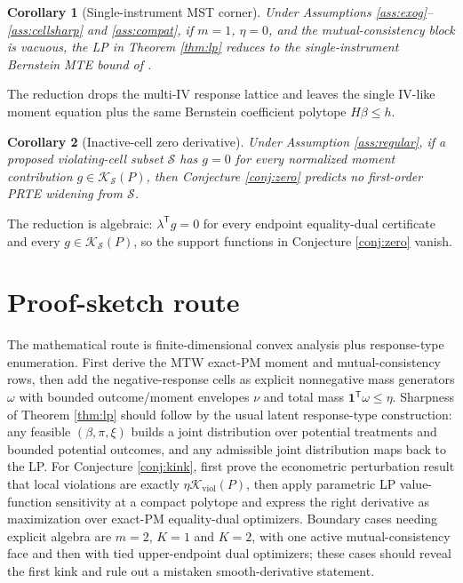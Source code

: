\documentclass[11pt]{article}
\newcommand{\transpose}{\mathsf{T}}
\theoremstyle{definition}
\theoremstyle{plain}
\newtheorem{corollary}{Corollary}
\theoremstyle{remark}
\begin{document}
\begin{corollary}[Single-instrument MST corner]\label{cor:single}
Under Assumptions \ref{ass:exog}--\ref{ass:cellsharp} and \ref{ass:compat}, if \(m=1\), \(\eta=0\), and the mutual-consistency block is vacuous, the LP in Theorem \ref{thm:lp} reduces to the single-instrument Bernstein MTE bound of \citet{MogstadSantosTorgovitsky2018}.
\end{corollary}
The reduction drops the multi-IV response lattice and leaves the single IV-like moment equation plus the same Bernstein coefficient polytope \(H\beta\le h\).

\begin{corollary}[Inactive-cell zero derivative]\label{cor:inactive}
Under Assumption \ref{ass:regular}, if a proposed violating-cell subset \(\mathcal S\) has \(g=0\) for every normalized moment contribution \(g\in\mathcal K_{\mathcal S}(P)\), then Conjecture \ref{conj:zero} predicts no first-order PRTE widening from \(\mathcal S\).
\end{corollary}
The reduction is algebraic: \(\lambda^\transpose g=0\) for every endpoint equality-dual certificate and every \(g\in\mathcal K_{\mathcal S}(P)\), so the support functions in Conjecture \ref{conj:zero} vanish.

\section{Proof-sketch route}
The mathematical route is finite-dimensional convex analysis plus response-type enumeration.  First derive the MTW exact-PM moment and mutual-consistency rows, then add the negative-response cells as explicit nonnegative mass generators \(\omega\) with bounded outcome/moment envelopes \(\nu\) and total mass \(\mathbf 1^\transpose\omega\le\eta\).  Sharpness of Theorem \ref{thm:lp} should follow by the usual latent response-type construction: any feasible \((\beta,\pi,\xi)\) builds a joint distribution over potential treatments and bounded potential outcomes, and any admissible joint distribution maps back to the LP.  For Conjecture \ref{conj:kink}, first prove the econometric perturbation result that local violations are exactly \(\eta\mathcal K_{\mathrm{viol}}(P)\), then apply parametric LP value-function sensitivity at a compact polytope and express the right derivative as maximization over exact-PM equality-dual optimizers.  Boundary cases needing explicit algebra are \(m=2\), \(K=1\) and \(K=2\), with one active mutual-consistency face and then with tied upper-endpoint dual optimizers; these cases should reveal the first kink and rule out a mistaken smooth-derivative statement.
\end{document}

